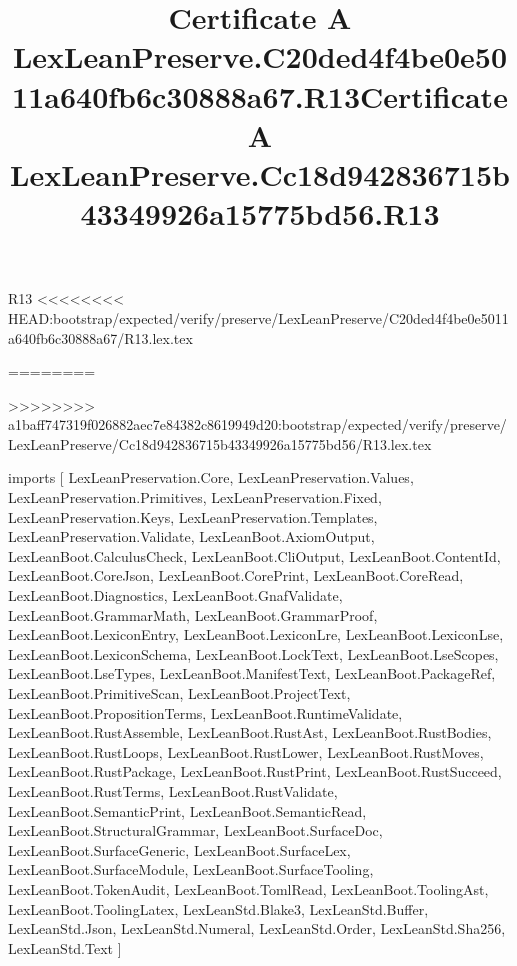 \begin{lexlean}{R13}
<<<<<<<< HEAD:bootstrap/expected/verify/preserve/LexLeanPreserve/C20ded4f4be0e5011a640fb6c30888a67/R13.lex.tex
\title{Certificate A LexLeanPreserve.C20ded4f4be0e5011a640fb6c30888a67.R13}
========
\title{Certificate A LexLeanPreserve.Cc18d942836715b43349926a15775bd56.R13}
>>>>>>>> a1baff747319f026882aec7e84382c8619949d20:bootstrap/expected/verify/preserve/LexLeanPreserve/Cc18d942836715b43349926a15775bd56/R13.lex.tex
\begin{coremodule}
imports [
  LexLeanPreservation.Core,
  LexLeanPreservation.Values,
  LexLeanPreservation.Primitives,
  LexLeanPreservation.Fixed,
  LexLeanPreservation.Keys,
  LexLeanPreservation.Templates,
  LexLeanPreservation.Validate,
  LexLeanBoot.AxiomOutput,
  LexLeanBoot.CalculusCheck,
  LexLeanBoot.CliOutput,
  LexLeanBoot.ContentId,
  LexLeanBoot.CoreJson,
  LexLeanBoot.CorePrint,
  LexLeanBoot.CoreRead,
  LexLeanBoot.Diagnostics,
  LexLeanBoot.GnafValidate,
  LexLeanBoot.GrammarMath,
  LexLeanBoot.GrammarProof,
  LexLeanBoot.LexiconEntry,
  LexLeanBoot.LexiconLre,
  LexLeanBoot.LexiconLse,
  LexLeanBoot.LexiconSchema,
  LexLeanBoot.LockText,
  LexLeanBoot.LseScopes,
  LexLeanBoot.LseTypes,
  LexLeanBoot.ManifestText,
  LexLeanBoot.PackageRef,
  LexLeanBoot.PrimitiveScan,
  LexLeanBoot.ProjectText,
  LexLeanBoot.PropositionTerms,
  LexLeanBoot.RuntimeValidate,
  LexLeanBoot.RustAssemble,
  LexLeanBoot.RustAst,
  LexLeanBoot.RustBodies,
  LexLeanBoot.RustLoops,
  LexLeanBoot.RustLower,
  LexLeanBoot.RustMoves,
  LexLeanBoot.RustPackage,
  LexLeanBoot.RustPrint,
  LexLeanBoot.RustSucceed,
  LexLeanBoot.RustTerms,
  LexLeanBoot.RustValidate,
  LexLeanBoot.SemanticPrint,
  LexLeanBoot.SemanticRead,
  LexLeanBoot.StructuralGrammar,
  LexLeanBoot.SurfaceDoc,
  LexLeanBoot.SurfaceGeneric,
  LexLeanBoot.SurfaceLex,
  LexLeanBoot.SurfaceModule,
  LexLeanBoot.SurfaceTooling,
  LexLeanBoot.TokenAudit,
  LexLeanBoot.TomlRead,
  LexLeanBoot.ToolingAst,
  LexLeanBoot.ToolingLatex,
  LexLeanStd.Blake3,
  LexLeanStd.Buffer,
  LexLeanStd.Json,
  LexLeanStd.Numeral,
  LexLeanStd.Order,
  LexLeanStd.Sha256,
  LexLeanStd.Text
]


\end{coremodule}
\end{lexlean}
